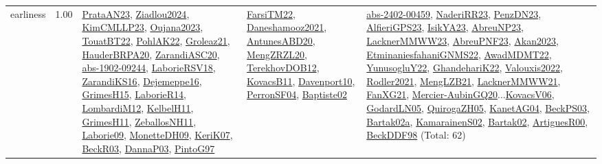 {\begin{longtable}{p{3cm}r>{\raggedright\arraybackslash}p{6cm}>{\raggedright\arraybackslash}p{6cm}>{\raggedright\arraybackslash}p{8cm}}
\index{earliness}\index{Concepts!earliness}earliness &  1.00 & \hyperref[detail:PrataAN23]{PrataAN23}, \hyperref[detail:Ziadlou2024]{Ziadlou2024}, \hyperref[detail:KimCMLLP23]{KimCMLLP23}, \hyperref[detail:Oujana2023]{Oujana2023}, \hyperref[detail:TouatBT22]{TouatBT22}, \hyperref[detail:PohlAK22]{PohlAK22}, \hyperref[detail:Groleaz21]{Groleaz21}, \hyperref[detail:HauderBRPA20]{HauderBRPA20}, \hyperref[detail:ZarandiASC20]{ZarandiASC20}, \hyperref[detail:abs-1902-09244]{abs-1902-09244}, \hyperref[detail:LaborieRSV18]{LaborieRSV18}, \hyperref[detail:ZarandiKS16]{ZarandiKS16}, \hyperref[detail:Dejemeppe16]{Dejemeppe16}, \hyperref[detail:GrimesH15]{GrimesH15}, \hyperref[detail:LaborieR14]{LaborieR14}, \hyperref[detail:LombardiM12]{LombardiM12}, \hyperref[detail:KelbelH11]{KelbelH11}, \hyperref[detail:GrimesH11]{GrimesH11}, \hyperref[detail:ZeballosNH11]{ZeballosNH11}, \hyperref[detail:Laborie09]{Laborie09}, \hyperref[detail:MonetteDH09]{MonetteDH09}, \hyperref[detail:KeriK07]{KeriK07}, \hyperref[detail:BeckR03]{BeckR03}, \hyperref[detail:DannaP03]{DannaP03}, \hyperref[detail:PintoG97]{PintoG97} & \hyperref[detail:FarsiTM22]{FarsiTM22}, \hyperref[detail:Daneshamooz2021]{Daneshamooz2021}, \hyperref[detail:AntunesABD20]{AntunesABD20}, \hyperref[detail:MengZRZL20]{MengZRZL20}, \hyperref[detail:TerekhovDOB12]{TerekhovDOB12}, \hyperref[detail:KovacsB11]{KovacsB11}, \hyperref[detail:Davenport10]{Davenport10}, \hyperref[detail:PerronSF04]{PerronSF04}, \hyperref[detail:Baptiste02]{Baptiste02} & \hyperref[detail:abs-2402-00459]{abs-2402-00459}, \hyperref[detail:NaderiRR23]{NaderiRR23}, \hyperref[detail:PenzDN23]{PenzDN23}, \hyperref[detail:AlfieriGPS23]{AlfieriGPS23}, \hyperref[detail:IsikYA23]{IsikYA23}, \hyperref[detail:AbreuNP23]{AbreuNP23}, \hyperref[detail:LacknerMMWW23]{LacknerMMWW23}, \hyperref[detail:AbreuPNF23]{AbreuPNF23}, \hyperref[detail:Akan2023]{Akan2023}, \hyperref[detail:EtminaniesfahaniGNMS22]{EtminaniesfahaniGNMS22}, \hyperref[detail:AwadMDMT22]{AwadMDMT22}, \hyperref[detail:YunusogluY22]{YunusogluY22}, \hyperref[detail:GhandehariK22]{GhandehariK22}, \hyperref[detail:Valouxis2022]{Valouxis2022}, \hyperref[detail:Rodler2021]{Rodler2021}, \hyperref[detail:MengLZB21]{MengLZB21}, \hyperref[detail:LacknerMMWW21]{LacknerMMWW21}, \hyperref[detail:FanXG21]{FanXG21}, \hyperref[detail:Mercier-AubinGQ20]{Mercier-AubinGQ20}...\hyperref[detail:KovacsV06]{KovacsV06}, \hyperref[detail:GodardLN05]{GodardLN05}, \hyperref[detail:QuirogaZH05]{QuirogaZH05}, \hyperref[detail:KanetAG04]{KanetAG04}, \hyperref[detail:BeckPS03]{BeckPS03}, \hyperref[detail:Bartak02a]{Bartak02a}, \hyperref[detail:KamarainenS02]{KamarainenS02}, \hyperref[detail:Bartak02]{Bartak02}, \hyperref[detail:ArtiguesR00]{ArtiguesR00}, \hyperref[detail:BeckDDF98]{BeckDDF98} (Total: 62)\\

\end{longtable}}

